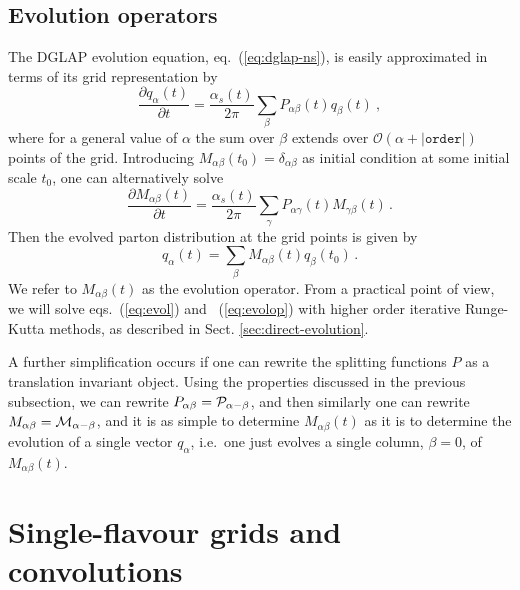 \documentclass[12pt]{article}
\newcommand{\lp}{\left(}
\newcommand{\rp}{\right)}
\newcommand{\ttt}[1]{\texttt{#1}}
\begin{document}
\subsection{Evolution operators}
\label{sec:evop}
The DGLAP evolution equation, eq.~(\ref{eq:dglap-ns}), is easily 
approximated in terms of its grid representation by
\begin{equation}
\label{eq:evol}
  \frac{\partial q_{\alpha}(t)}{\partial t}  = \frac{\alpha_s(t)}{2\pi}
\sum_{\beta} P_{\alpha\beta}(t) q_\beta(t) \ ,
\end{equation}
where for a general value of $\alpha$ the sum over $\beta$ extends over
$\mathcal{O}\lp \alpha + |\ttt{order}| \rp$ 
points of the grid.
Introducing $M_{\alpha\beta}(t_0) = \delta_{\alpha\beta}$ as initial
condition at some initial scale $t_0$, one can
alternatively solve
\begin{equation}
\label{eq:evolop}
  \frac{\partial M_{\alpha\beta}(t) }{\partial t} = \frac{\alpha_s(t)}{2\pi}
\sum_{\gamma} P_{\alpha\gamma}(t)
  M_{\gamma\beta}(t)\,.
\end{equation}
Then the evolved parton distribution at the grid points is
given by
\begin{equation}
  q_{\alpha}(t)  = \sum_{\beta} M_{\alpha\beta}(t) q_\beta(t_0)\,.
\end{equation}
We refer to $M_{\alpha\beta}(t)$ as the evolution operator. From 
a practical point of view, we will solve eqs.~(\ref{eq:evol})
and ~(\ref{eq:evolop})
with higher order iterative Runge-Kutta methods, as described in
Sect. \ref{sec:direct-evolution}.

A further simplification occurs 
if one can rewrite the splitting functions $P$ as
a translation invariant object. Using the properties
discussed in the previous subsection, 
we can rewrite $P_{\alpha\beta} = \cal P_{\alpha-\beta}$,
and then similarly one can rewrite $M_{\alpha\beta} = \cal
M_{\alpha-\beta}$, and it is as simple to determine
$M_{\alpha\beta}(t)$ as it is to determine the evolution of a single
vector $q_\alpha$, i.e.\ one just evolves a single column, $\beta =
0$, of $M_{\alpha\beta}(t)$.



\section{Single-flavour grids and convolutions}
\label{sec:singleflav}
\end{document}
